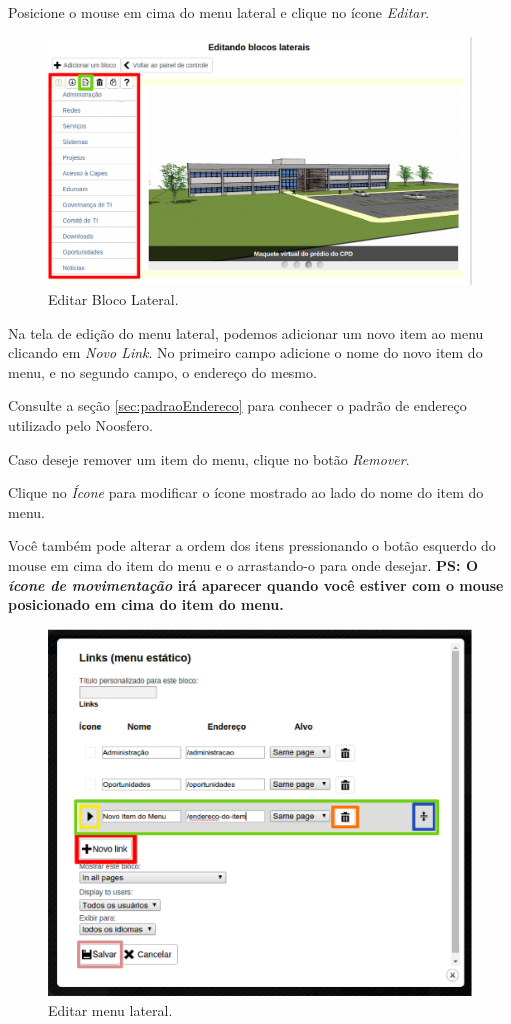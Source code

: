 \newpage
Posicione o mouse em cima do menu lateral e clique no ícone \emph{\color{green}Editar}.

\begin{figure}[h]
     \centering
       \includegraphics[keepaspectratio=true,scale=0.49]{figuras/editarBlocoLateral.eps}
     \caption{Editar Bloco Lateral.}
     \label{fig:editarBloco}
\end{figure}

Na tela de edição do menu lateral, podemos adicionar um novo item ao menu clicando em \emph{\color{red}Novo Link}. No primeiro campo adicione o nome do novo item do menu, e no segundo campo, o endereço do mesmo.

Consulte a seção \ref{sec:padraoEndereco} para conhecer o padrão de endereço utilizado pelo Noosfero.

Caso deseje remover um item do menu, clique no botão \emph{\color{orange}Remover}.

Clique no \emph{\color{yellow}Ícone} para modificar o ícone mostrado ao lado do nome do item do menu.

Você também pode alterar a ordem dos itens pressionando o botão esquerdo do mouse em cima do item do menu e o arrastando-o para onde desejar. 
\textbf{PS: O \emph{\color{blue}ícone de movimentação} irá aparecer quando você estiver com o mouse posicionado em cima do item do menu.}

\begin{figure}[h]
     \centering
       \includegraphics[keepaspectratio=true,scale=0.4]{figuras/editarMenuLateral.eps}
     \caption{Editar menu lateral.}
     \label{fig:editarMenuLateral}
\end{figure}
